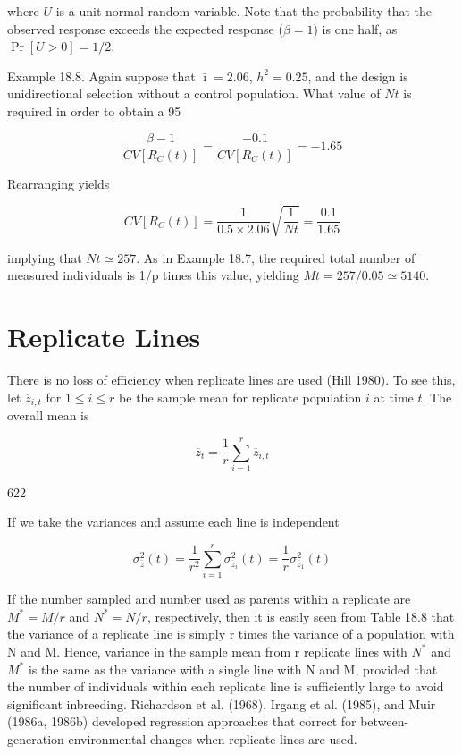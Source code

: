 \documentclass{article}
\begin{document}
where $U$ is a unit normal random variable. Note that the probability that the observed response exceeds the expected response ($\beta = 1$) is one half, as $\Pr[U > 0] = 1/2$.

Example 18.8. Again suppose that  $ \bar{\imath} = 2.06 $,  $ h^2 = 0.25 $, and the design is unidirectional selection without a control population. What value of  $ Nt $ is required in order to obtain a 95%

\begin{equation}
\frac{\beta-1}{CV\left[R_{C}(t)\right]}=\frac{-0.1}{CV\left[R_{C}(t)\right]}=-1.65
\end{equation}

Rearranging yields

\begin{equation}
CV\left[R_{C}(t)\right]=\frac{1}{0.5\times2.06}\sqrt{\frac{1}{Nt}}=\frac{0.1}{1.65}
\end{equation}

implying that  $ Nt \simeq 257 $. As in Example 18.7, the required total number of measured individuals is 1/p times this value, yielding  $ Mt = 257/0.05 \simeq 5140 $.

\section{Replicate Lines}
There is no loss of efficiency when replicate lines are used (Hill 1980). To see this, let  $ \overline{z}_{i,t} $ for  $ 1 \leq i \leq r $ be the sample mean for replicate population  $ i $ at time  $ t $. The overall mean is

\begin{equation}
\overline{z}_{t}=\frac{1}{r}\sum_{i=1}^{r}\overline{z}_{i,t}
\tag{18.35a}
\label{eq:18_35a}
\end{equation}

622

If we take the variances and assume each line is independent

\begin{equation}
\sigma_{\overline{z}}^{2}(t)=\frac{1}{r^{2}}\sum_{i=1}^{r}\sigma_{\overline{z}_{i}}^{2}(t)=\frac{1}{r}\sigma_{\overline{z}_{1}}^{2}(t)
\tag{18.35b}
\label{eq:18_35b}
\end{equation}

If the number sampled and number used as parents within a replicate are  $ M^* = M/r $ and  $ N^* = N/r $, respectively, then it is easily seen from Table 18.8 that the variance of a replicate line is simply r times the variance of a population with N and M. Hence, variance in the sample mean from r replicate lines with  $ N^* $ and  $ M^* $ is the same as the variance with a single line with N and M, provided that the number of individuals within each replicate line is sufficiently large to avoid significant inbreeding. Richardson et al. (1968), Irgang et al. (1985), and Muir (1986a, 1986b) developed regression approaches that correct for between-generation environmental changes when replicate lines are used.
\end{document}
